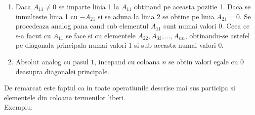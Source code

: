 \documentclass{article}
\begin{document}
        \begin{enumerate}
            \item Daca $A_{11}\neq 0$ se imparte linia 1 la $A_{11}$ obtinand pe aceasta pozitie 1. Daca se inmulteste linia 1 cu $-A_{21}$ si se aduna la linia 2 se obtine pe linia $A_{21} = 0$. Se procedeaza analog pana cand sub elementul $A_{11}$ sunt numai valori $0$. Ceea ce s-a facut cu $A_{11}$ se face si cu elementele $A_{22}, A_{33}, \dots ,A_{nn}$, obtinandu-se astefel pe diagonala principala numai valori $1$ si sub aceasta numai valori $0$.
            \item Absolut analog cu pasul $1$, incepand cu coloana $n$ se obtin valori egale cu $0$ deasupra diagonalei principale.
        \end{enumerate}
        De remarcat este faptul ca in toate operatiunile descrise mai sus participa si elementele din coloana termenilor liberi. \\
		Exemplu: \\
\end{document}
